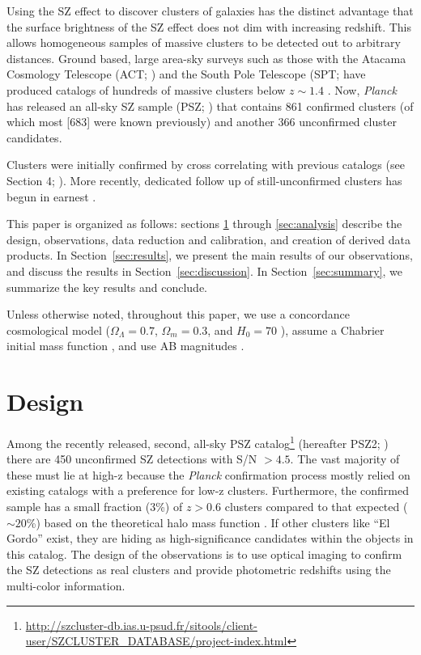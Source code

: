 \documentclass[apj, revtex4-1]{emulateapj}
\begin{document}
Using the SZ effect to discover clusters of galaxies has the distinct advantage that the surface brightness of the SZ effect does not dim with increasing redshift. This allows homogeneous samples of massive clusters to be detected out to arbitrary distances. Ground based, large area-sky surveys such as those with the Atacama Cosmology Telescope (ACT; \citealt{Swetz2011}) and the South Pole Telescope (SPT; \citealt{Carlstrom2011} have produced catalogs of hundreds of massive clusters below $z \sim 1.4$ . Now, \textit{Planck} \citep{Tauber2010, PlanckCollaboration2011} has released an all-sky SZ sample (PSZ; \citealt{PlanckCollaboration2014, PlanckCollaboration2015}) that contains 861 confirmed clusters (of which most [683] were known previously) and another 366 unconfirmed cluster candidates.

Clusters were initially confirmed by cross correlating with previous catalogs (see Section 4; \citealt{PlanckCollaboration2014}). More recently, dedicated follow up of still-unconfirmed clusters has begun in earnest .

This paper is organized as follows: sections \ref{sec:design} through \ref{sec:analysis} describe the design, observations, data reduction and calibration, and creation of derived data products. In Section~\ref{sec:results}, we present the main results of our observations, and discuss the results in Section~\ref{sec:discussion}. In Section~\ref{sec:summary}, we summarize the key results and conclude.

Unless otherwise noted, throughout this paper, we use a concordance cosmological model ($\Omega_\Lambda = 0.7$, $\Omega_m = 0.3$, and $H_0= 70$ \kms \mpc), assume a Chabrier initial mass function \citep{Chabrier2003}, and use AB magnitudes \citep{Oke1974}.

\section{Design}\label{sec:design}
Among the recently released, second, all-sky PSZ catalog\footnote{\hbox{\url{http://szcluster-db.ias.u-psud.fr/sitools/client-user/SZCLUSTER_DATABASE/project-index.html}}} (hereafter PSZ2; \citealt{PlanckCollaboration2015}) there are 450 unconfirmed SZ detections with S/N $> 4.5$. The vast majority of these must lie at high-z because the \textit{Planck} confirmation process \citep{PlanckCollaboration2014} mostly relied on existing catalogs with a preference for low-z clusters. Furthermore, the confirmed sample has a small fraction (3\%) of $z > 0.6$ clusters compared to that expected ($\sim20$\%) based on the theoretical halo mass function . If other clusters like ``El Gordo'' exist, they are hiding as high-significance candidates within the objects in this catalog. The design of the observations is to use optical imaging to confirm the SZ detections as real clusters and provide photometric redshifts using the multi-color information.
\end{document}
